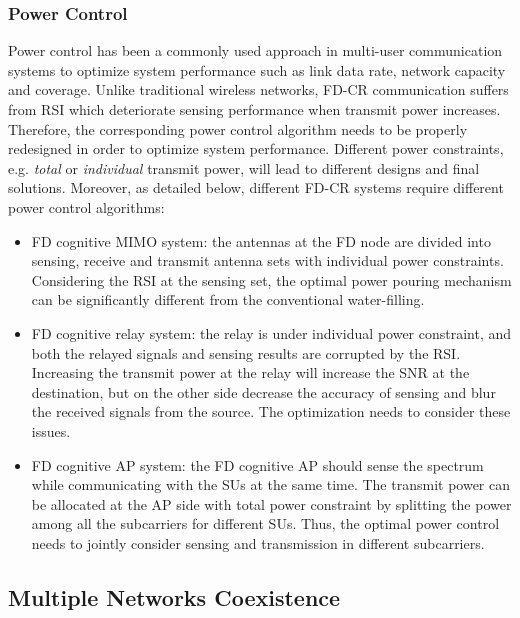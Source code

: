 \documentclass[onecolumn,12pt]{IEEEtran}
\begin{document}
\subsubsection{Power Control}

Power control has been a commonly used approach in multi-user communication systems to optimize system performance such as link data rate, network capacity and coverage. Unlike traditional wireless networks, FD-CR communication suffers from RSI which deteriorate sensing performance when transmit power increases. Therefore, the corresponding power control algorithm needs to be properly redesigned in order to optimize system performance. Different power constraints, e.g. {\em total} or {\em individual} transmit power, will lead to different designs and final solutions. Moreover, as detailed below, different FD-CR systems require different power control algorithms:

\begin{itemize}
  \item FD cognitive MIMO system: the antennas at the FD node are divided into sensing, receive and transmit antenna sets with individual power constraints. Considering the RSI at the sensing set, the optimal power pouring mechanism can be significantly different from the conventional water-filling.
  \item FD cognitive relay system: the relay is under individual power constraint, and both the relayed signals and sensing results are corrupted by the RSI. Increasing the transmit power at the relay will increase the SNR at the destination, but on the other side decrease the accuracy of sensing and blur the received signals from the source. The optimization needs to consider these issues.
  \item FD cognitive AP system: the FD cognitive AP should sense the spectrum while communicating with the SUs at the same time. The transmit power can be allocated at the AP side with total power constraint by splitting the power among all the subcarriers for different SUs. Thus, the optimal power control needs to jointly consider sensing and transmission in different subcarriers.
\end{itemize}

\subsection{Multiple Networks Coexistence}
\end{document}
